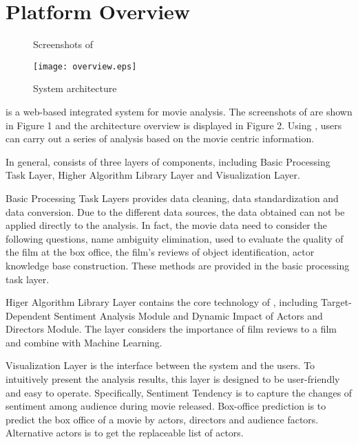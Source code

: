 \section{Platform Overview}
\label{sec:overviw}
\begin{figure*}[!htbp]
  \centering
     \hfill
    \hfill
    \hfill
    \hfill
    \hfill
  \caption{Screenshots of \system}
\end{figure*}

\begin{figure}[!htbp]
\centering
\texttt{[image: overview.eps]}
\caption{System architecture}
\label{fig:mhin}
\end{figure}

\system is a web-based integrated system for movie analysis. The screenshots of \system are shown in Figure 1 and the architecture overview is displayed in Figure 2. Using \system, users can carry out a series of analysis based on the movie centric information.
\par In general, \system consists of three layers of components, including Basic Processing Task Layer, Higher Algorithm Library Layer and Visualization Layer.
\par Basic Processing Task Layers provides data cleaning, data standardization and data conversion. Due to the different data sources, the data obtained can not be applied directly to the analysis. In fact, the movie data need to consider the following questions, name ambiguity elimination, used to evaluate the quality of the film at the box office, the film's reviews of object identification, actor knowledge base construction. These methods are provided in the basic processing task layer.
\par Higer Algorithm Library Layer contains the core technology of \system, including Target-Dependent Sentiment Analysis Module and Dynamic Impact of Actors and Directors Module. The layer considers the importance of film reviews to a film and combine with Machine Learning.
\par Visualization Layer is the interface between the system and the users. To intuitively present the analysis results, this layer is designed to be user-friendly and easy to operate. Specifically, Sentiment Tendency is to capture the changes of sentiment among audience during movie released. Box-office prediction is to predict the box office of a movie by actors, directors and audience factors. Alternative actors is to get the replaceable list of actors.

